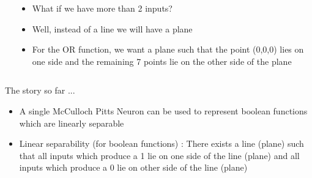 \begin{frame}
\begin{columns}
\begin{overlayarea}{\textwidth}{\textheight}
\begin{center}
{
				}
			\end{center}
		\end{overlayarea}

		\begin{overlayarea}{\textwidth}{\textheight}
			\begin{itemize}\justifying
				\item<1-> What if we have more than 2 inputs?
				\item<3-> Well, instead of a line we will have a plane
				\item<4-> For the OR function, we want a plane such that the point (0,0,0) lies on one side and the remaining 7 points lie on the other side of the plane

			\end{itemize}
		\end{overlayarea}
	\end{columns}
\end{frame}

\begin{frame}
	\begin{block}{The story so far ...}
			\begin{itemize}\justifying
				\item<1-> A single McCulloch Pitts Neuron can be used to represent boolean functions which are linearly separable
				\item<2-> Linear separability (for boolean functions) : There exists a line (plane) such that all inputs which produce a 1 lie on one side of the line (plane) and all inputs which produce a 0 lie on other side of the line (plane)
			\end{itemize}
	\end{block}
\end{frame}

